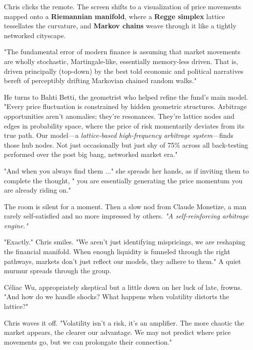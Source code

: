 Chris clicks the remote. The screen shifts to a visualization of price movements mapped onto a \textbf{Riemannian manifold}, where a \textbf{Regge simplex} lattice tessellates the curvature, and \textbf{Markov chains} weave through it like a tightly networked cityscape.

\smallskip

"The fundamental error of modern finance is assuming that market movements are wholly stochastic, Martingale-like, essentially memory-less driven. That is, driven principally (top-down) by the best told economic and political narratives bereft of perceptibly drifting Markovian chained random walks."

\smallskip

He turns to Bahti Betti, the geometrist who helped refine the fund's main model. "Every price fluctuation is constrained by hidden geometric structures. Arbitrage opportunities aren’t anomalies; they’re resonances. They’re lattice nodes and edges in probability space, where the price of risk momentarily deviates from its true path. Our model—a \textit{lattice-based high-frequency arbitrage system}—finds those hub nodes. Not just occasionally but just shy of 75\% across all back-testing performed over the post big bang, networked market era."

\smallskip

"And when you always find them ..." she spreads her hands, as if inviting them to complete the thought, " you are essentially generating the price momentum you are already riding on."

\smallskip

The room is silent for a moment. Then a slow nod from Claude Monetize, a man rarely self-satisfied and no more impressed by others. \textit{"A self-reinforcing arbitrage engine."}

\smallskip

"Exactly." Chris smiles. "We aren’t just identifying mispricings, we are reshaping the financial manifold. When enough liquidity is funneled through the right pathways, markets don’t just reflect our models, they adhere to them." A quiet murmur spreads through the group.

\smallskip

Céliac Wu, appropriately skeptical but a little down on her luck of late, frowns. "And how do we handle shocks? What happens when volatility distorts the lattice?"

Chris waves it off. "Volatility isn’t a risk, it’s an amplifier. The more chaotic the market appears, the clearer our advantage. We may not predict where price movements go, but we can prolongate their connection."

